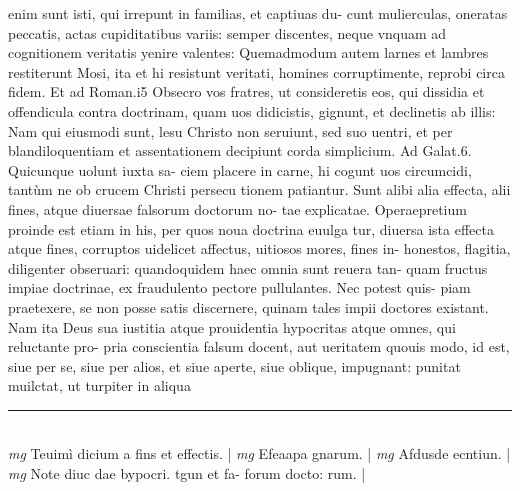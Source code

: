 \documentclass{article}
\begin{document}
\begin{pages}
enim sunt isti, qui irrepunt in familias, et captiuas du-   cunt mulierculas, oneratas peccatis, actas cupiditatibus variis: semper discentes, neque    vnquam ad cognitionem veritatis yenire valentes: Quemadmodum autem larnes et   lambres restiterunt Mosi, ita et hi resistunt veritati, homines corruptimente, reprobi   circa fidem. Et ad Roman.i5 Obsecro vos fratres, ut consideretis eos, qui dissidia et   offendicula contra doctrinam, quam uos didicistis, gignunt, et declinetis ab illis: Nam   qui eiusmodi sunt, lesu Christo non seruiunt, sed suo uentri, et per blandiloquentiam   et assentationem decipiunt corda simplicium. Ad Galat.6. Quicunque  uolunt iuxta sa-   ciem placere in carne, hi cogunt uos circumcidi, tantùm ne ob crucem Christi persecu   tionem patiantur. Sunt alibi alia effecta, alii fines, atque  diuersae falsorum doctorum no- tae explicatae. Operaepretium proinde est etiam in his, per quos noua doctrina euulga tur, diuersa ista effecta atque  fines, corruptos uidelicet affectus, uitiosos mores, fines in- honestos, flagitia, diligenter obseruari: quandoquidem haec omnia sunt reuera tan- quam fructus impiae doctrinae, ex fraudulento pectore pullulantes. Nec potest quis- piam praetexere, se non posse satis discernere, quinam tales impii doctores existant. Nam ita Deus sua iustitia atque  prouidentia hypocritas atque  omnes, qui reluctante pro- pria conscientia falsum docent, aut ueritatem quouis modo, id est, siue per se, siue per alios, et siue aperte, siue oblique, impugnant: punitat muilctat, ut turpiter in aliqua  \pend
\vspace{0.5cm}\noindent
\vspace{0.2cm}\rule{1cm}{0.2pt}\\ 
\hspace{0.2cm}\textit{mg}
\footnotesize Teuimì dicium a fins et effectis. 
\normalsize| 
\hspace{0.2cm}\textit{mg}
\footnotesize Efeaapa gnarum. 
\normalsize| 
\hspace{0.2cm}\textit{mg}
\footnotesize Afdusde ecntiun. 
\normalsize| 
\hspace{0.2cm}\textit{mg}
\footnotesize Note diuc dae bypocri. tgun et fa- forum docto: rum. 
\normalsize| 

\end{pages}
\end{document}
